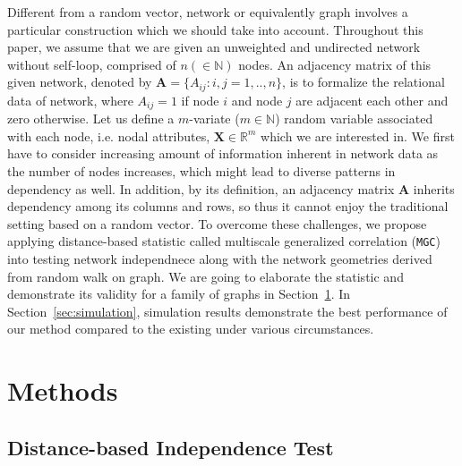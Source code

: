 \documentclass[11pt]{article}
\theoremstyle{definition}
\begin{document}
Different from a random vector, network or equivalently graph involves a particular construction which we should take into account. Throughout this paper, we assume that we are given an unweighted and undirected network without self-loop, comprised of $n (\in \mathbb{N})$ nodes. An adjacency matrix of this given network, denoted by $\mathbf{A} = \{A_{ij} : i,j= 1,..,n \}$, is to formalize the relational data of network, where $A_{ij} = 1$ if node $i$ and node $j$ are adjacent each other and zero otherwise. Let us define a $m$-variate ($m \in \mathbb{N}$) random variable associated with each node, i.e. nodal attributes, $\mathbf{X}  \in \mathbb{R}^{m}$ which we are interested in. We first have to consider increasing amount of information inherent in network data as the number of nodes increases, which might lead to diverse patterns in dependency as well. In addition, by its definition, an adjacency matrix $\mathbf{A}$ inherits dependency among its columns and rows, so thus it cannot enjoy the traditional setting based on a random vector. To overcome these challenges, we propose applying distance-based statistic called multiscale generalized correlation (\texttt{MGC})~\citep{shen2016discovering} into testing network independnece along with the network geometries derived from random walk on graph. We are going to elaborate the statistic and demonstrate its validity for a family of graphs in Section~\ref{sec:method}. In Section~\ref{sec:simulation}, simulation results demonstrate the best performance of our method compared to the existing under various circumstances.
	\vspace*{-0.2cm}
\section{Methods}
\label{sec:method}
	\vspace*{-0.4cm}
\subsection{Distance-based Independence Test}
\label{ssec:method1}
\end{document}

